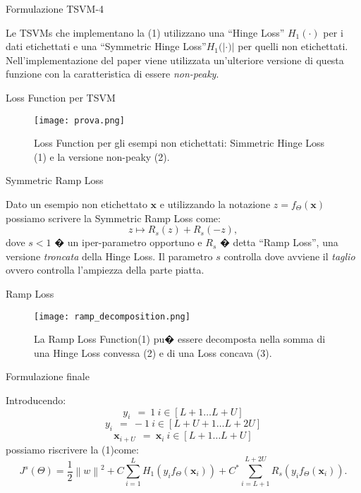 \documentclass[mathserif]{beamer}
\begin{document}
\begin{frame}{Formulazione TSVM-4}
\begin{block}{}
Le TSVMs che implementano la (1) utilizzano una "`Hinge Loss"' $H_1(\cdot)$ per i dati etichettati e una "`Symmetric Hinge Loss"'$H_1(|\cdot)|$ per quelli non etichettati.  Nell'implementazione del paper viene utilizzata un'ulteriore versione di questa funzione con la caratteristica di essere  \textit{non-peaky}.
\end{block}
\end{frame}




\begin{frame}{Loss Function per TSVM}
\begin{figure}[htbp]
	\centering
		\texttt{[image: prova.png]}
	\caption{Loss Function per gli esempi non etichettati: Simmetric Hinge Loss (1) e la versione non-peaky (2).}
	\label{fig:gres}
\end{figure}
\end{frame}


\begin{frame}{Symmetric Ramp Loss}
\begin{block}{}
Dato un esempio non etichettato $\textbf{x}$ e utilizzando la notazione $z=f_\Theta(\textbf{x})$ possiamo scrivere la Symmetric Ramp Loss come:
\begin{equation}
	z \mapsto R_s(z)+R_s(-z),
\end{equation}
dove $s<1$ � un iper-parametro opportuno e $R_s$ � detta "`Ramp Loss"', una versione \textsl{troncata} della Hinge Loss. Il parametro $s$ controlla dove avviene il \textsl{taglio} ovvero controlla l'ampiezza della parte piatta.
\end{block}
\end{frame}

\begin{frame}{Ramp Loss }
\begin{figure}[htbp]
	\centering
		\texttt{[image: ramp\_decomposition.png]}
	\caption{La Ramp Loss Function(1) pu� essere decomposta nella somma di una Hinge Loss convessa (2) e di una Loss concava (3).}
	\label{fig:gres}
\end{figure}
\end{frame}


\begin{frame}{Formulazione finale}
\begin{block}{}
Introducendo:
	\[y_i\ \ =\ 1\ i \in [L+1 \ldots L+U]
	\]
	\[y_i\ \ =\ -1\ i \in [L+U+1 \ldots L+2U]
\]
	\[\textbf{x}_{i+U}\ \ =\ \textbf{x}_i \ i \in [L+1 \ldots L+U]
\]
possiamo riscrivere la (1)come:
\begin{equation}
	J^s(\Theta)= \frac{1}{2}\left\|w\right\|^2+C\sum_{i=1}^{L}H_1(y_if_\Theta(\textbf{x}_i))+C^*\sum_{i=L+1}^{L+2U}R_s(y_if_\Theta(\textbf{x}_i)).
\end{equation}
\end{block}
\end{frame}
\end{document}
